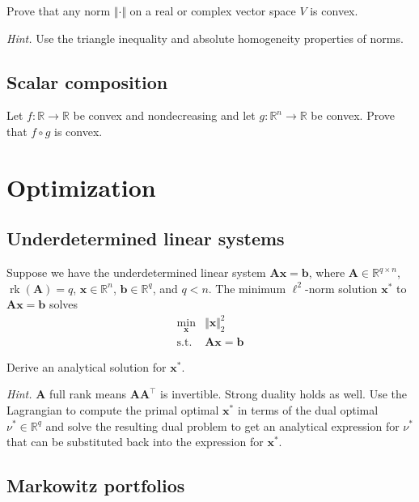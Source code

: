 \documentclass{article}
\numberwithin{equation}{section}
\begin{document}
Prove that any norm $ \Vert\cdot\Vert $ on a real or complex vector space
$ V $ is convex.

\medskip

\textit{Hint.} Use the triangle inequality and absolute homogeneity properties
of norms.

\subsection{Scalar composition}

Let $ f : \mathbb{R} \rightarrow \mathbb{R} $ be convex and nondecreasing and
let $ g : \mathbb{R}^n \rightarrow \mathbb{R} $ be convex. Prove that
$ f \circ g $ is convex.

\section{Optimization}

\subsection{Underdetermined linear systems}

Suppose we have the underdetermined linear system $ \mathbf{Ax} = \mathbf{b} $,
where $ \mathbf{A} \in \mathbb{R}^{q \times n} $,
$ \operatorname{rk}(\mathbf{A}) = q $,
$ \mathbf{x} \in \mathbb{R}^n $, $ \mathbf{b} \in \mathbb{R}^q $, and
$ q < n $. The minimum $ \ell^2 $-norm solution $ \mathbf{x}^* $ to
$ \mathbf{Ax} = \mathbf{b} $ solves
\begin{equation*}
    \begin{array}{ll}
        \displaystyle\min_\mathbf{x} & \Vert\mathbf{x}\Vert_2^2 \\
        \text{s.t.} & \mathbf{Ax} = \mathbf{b}
    \end{array}
\end{equation*}

Derive an analytical solution for $ \mathbf{x}^* $.

\medskip

\textit{Hint.} $ \mathbf{A} $ full rank means $ \mathbf{AA}^\top $ is
invertible. Strong duality holds as well. Use the Lagrangian to compute the
primal optimal $ \mathbf{x}^* $ in terms of the dual optimal
$ \nu^* \in \mathbb{R}^q $ and solve the resulting dual problem to get an
analytical expression for $ \nu^* $ that can be substituted back into the
expression for $ \mathbf{x}^* $.

\subsection{Markowitz portfolios}
\end{document}

